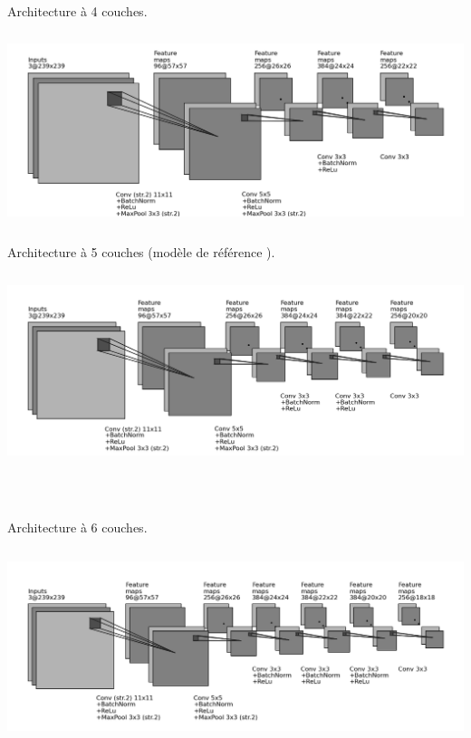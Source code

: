 \documentclass[10pt,twocolumn,letterpaper,french]{article}
\begin{document}
\begin{appendices}
    Architecture à 4 couches.
    \begin{center}
    \includegraphics[height=160pt]{images/archis/convnet_cnn4.png}
    \end{center}
    \clearpage

    Architecture à 5 couches (modèle de référence \cite{siamfc}).
    \begin{center}
    \includegraphics[height=160pt]{images/archis/convnet_cnn5.png}
    \end{center}
    \hspace{1cm}\\
    \hspace{1cm}\\

    Architecture à 6 couches.
    \begin{center}
    \includegraphics[height=160pt]{images/archis/convnet_cnn6.png}
    \end{center}
    \hspace{1cm}\\
    \hspace{1cm}\\


\end{appendices}
\end{document}
